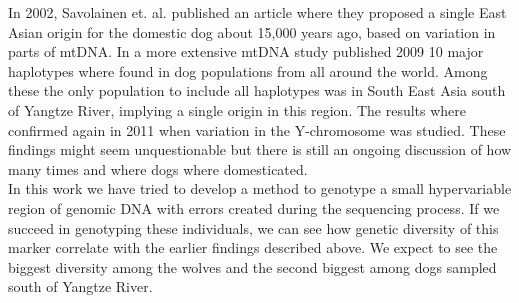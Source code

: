 In 2002, Savolainen et.{ }al.{ }published an article \cite{savo02} where they proposed a single East Asian origin for the domestic dog about 15,000 years ago, based on variation in parts of mtDNA. In a more extensive mtDNA study published 2009 \cite{pang09} 10 major haplotypes where found in dog populations from all around the world. Among these the only population to include all haplotypes was in South East Asia south of Yangtze River, implying a single origin in this region. The results where confirmed again in 2011 \cite{ding11} when variation in the Y-chromosome was studied.
These findings might seem unquestionable but there is still an ongoing discussion of how many times and where dogs where domesticated.\\ 

In this work we have tried to develop a method to genotype a small hypervariable region of genomic DNA with errors created during the sequencing process. If we succeed in genotyping these individuals, we can see how genetic diversity of this marker correlate with the earlier findings described above. We expect to see the biggest diversity among the wolves and the second biggest among dogs sampled south of Yangtze River.  



